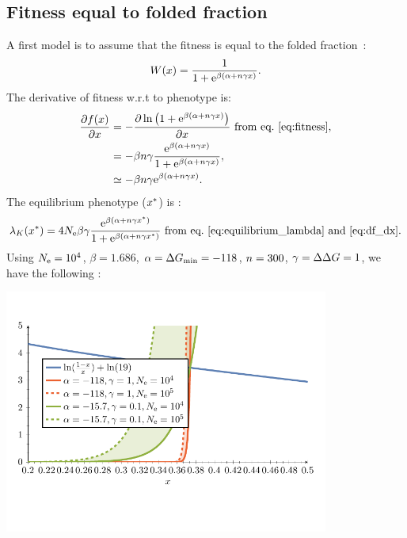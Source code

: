 \documentclass{article}
\begin{document}
\subsection{Fitness equal to folded fraction}
\label{subsec:fitness-equal-to-folded-fraction}

A first model is to assume that the fitness is equal to the folded fraction~\citep{Goldstein2013}:
\begin{gather}
    W (x) = \frac{1}{1 + \text{e}^{\beta(\alpha + n \gamma x)}}. \label{eq:fitness}
\end{gather}
The derivative of fitness w.r.t to {phenotype} is:
\begin{align}
    \frac{\partial  f (x)}{\partial x}  & = - \frac{\partial \ln \left( 1 + \text{e}^{\beta(\alpha + n \gamma x)} \right)}{\partial x} \text{ from eq.~\ref{eq:fitness}}, \\
    & = - \beta n \gamma \frac{\text{e}^{\beta(\alpha + n \gamma x)}}{1 + \text{e}^{\beta(\alpha + n \gamma x)}} \label{eq:df_dx},\\
    & \simeq - \beta n \gamma \text{e}^{\beta(\alpha + n \gamma x)}.
\end{align}
The equilibrium {phenotype} ($x^{*}$) is :
\begin{gather}
    \lambda_{K}(x^{*}) = 4N_{\text{e}} \beta \gamma \frac{\text{e}^{\beta(\alpha + n \gamma x^{*})}}{1 + \text{e}^{\beta(\alpha + n \gamma x^{*})}}  \text{ from eq.~\ref{eq:equilibrium_lambda} and~\ref{eq:df_dx}}.
\end{gather}
Using $N_{\text{e}}=10^4$, $\beta=1.686$, $\alpha = \Delta G_{\text{min}} = -118$, $n=300$, $\gamma=\Delta \Delta G=1$, we have the following :
\begin{center}
    \includegraphics[width=0.8\textwidth, page=4] {analytical-relaxation}
\end{center}
\end{document}
